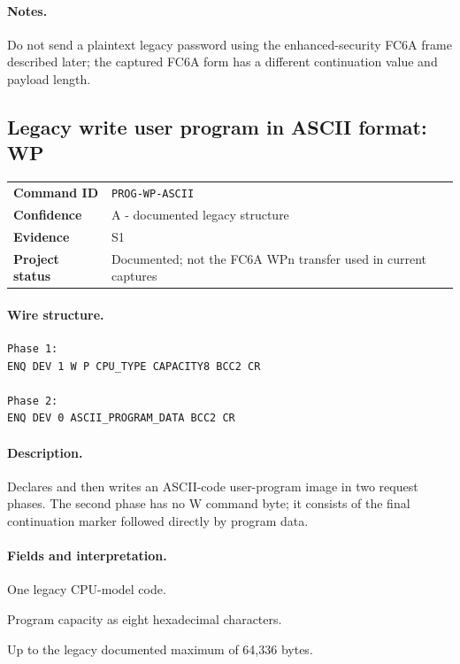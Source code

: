 \documentclass[10pt,letterpaper]{article}
\begin{document}
\paragraph{Notes.} Do not send a plaintext legacy password using the enhanced-security FC6A frame described later; the captured FC6A form has a different continuation value and payload length.

\subsection{Legacy write user program in ASCII format: WP}
\begin{tabularx}{\textwidth}{@{}>{\bfseries}p{2.8cm}X@{}}
Command ID & \texttt{PROG-WP-ASCII} \\
Confidence & A - documented legacy structure \\
Evidence & S1 \\
Project status & Documented; not the FC6A WPn transfer used in current captures \\
\end{tabularx}
\vspace{0.35em}
\paragraph{Wire structure.}
\begin{Verbatim}[breaklines=true,breakanywhere=true,fontsize=\small]
Phase 1:
ENQ DEV 1 W P CPU_TYPE CAPACITY8 BCC2 CR

Phase 2:
ENQ DEV 0 ASCII_PROGRAM_DATA BCC2 CR
\end{Verbatim}
\paragraph{Description.} Declares and then writes an ASCII-code user-program image in two request phases. The second phase has no W command byte; it consists of the final continuation marker followed directly by program data.
\paragraph{Fields and interpretation.}
\begin{description}[style=nextline,leftmargin=3.2cm,labelwidth=3.0cm,font=\normalfont\bfseries]
\item[CPU\_TYPE] One legacy CPU-model code.
\item[CAPACITY8] Program capacity as eight hexadecimal characters.
\item[ASCII\_PROGRAM\_DATA] Up to the legacy documented maximum of 64,336 bytes.
\end{description}
\end{document}
